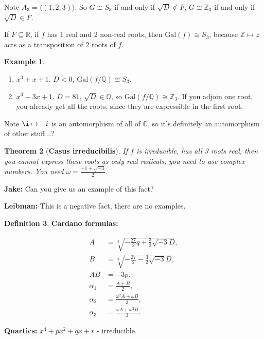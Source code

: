 \documentclass[9pt,reqno,twoside]{amsbook}
\theoremstyle{plain}
\newtheorem{theorem}{Theorem}[chapter]
\numberwithin{section}{chapter}
\numberwithin{equation}{chapter}
\theoremstyle{definition}
\newtheorem{Def}[theorem]{Definition}
\newtheorem{Ex}[theorem]{Example}
\theoremstyle{remark}
\theoremstyle{plain}
\newcommand{\sub}{\subseteq}
\newcommand{\R}{\mathbb{R}}
\newcommand{\z}{\mathbb{Z}}
\newcommand{\Q}{\mathbb{Q}}
\renewcommand{\c}{\mathbb{C}}
\newcommand{\bb}{\vspace{3mm}}
\newcommand{\bee}{\begin{equation}\begin{aligned}}
\newcommand{\eee}{\end{aligned}\end{equation}}
\newcommand{\fracc}{\frac}
\newcommand{\gal}{\mathrm{Gal}}
\newcommand{\qwe}{\sqrt}
\newcommand{\wer}{\sqrt}
\renewcommand{\bar}{\overline}%
\begin{document}
Note $A_3 = \langle (1,2,3) \rangle$. So $G \cong S_3$ if and only if $\qwe{D} \notin F$, $G \cong \z_3$ if and only if $\qwe{D} \in F$. 

\bb

If $F \sub \R$, if $f$ has 1 real and 2 non-real roots, then $\gal(f) \cong S_3$, because $\z \mapsto \bar{z}$ acts as a transposition of $2$ roots of $f$. 

\begin{Ex}
\begin{enumerate}
\item $x^3 + x + 1$. $D < 0$, $\gal(f/\Q) \cong S_3$. 

\item $x^3 - 3x + 1$. $D = 81$, $\qwe{D} \in \Q$, so $\gal(f/\Q) \cong \z_3$. If you adjoin one root, you already get all the roots, since they are expressible in the first root. 
\end{enumerate}
\end{Ex}

Note $\i \mapsto -i$ is an automorphism of all of $\c$, so it's definitely an automorphism of other stuff...?

\begin{theorem}[\textbf{Casus irreducibilis}]
If $f$ is irreducible, has all 3 roots real, then you cannot express these roots as only real radicals, you need to use complex numbers. You need $\omega = \fracc{-1 + \qwe{-3}}{2}$. 
\end{theorem}

\textbf{Jake: }Can you give us an example of this fact?

\textbf{Leibman: }This is a negative fact, there are no examples. 

\begin{Def}
\textbf{Cardano formulas: }

\bee
A &= \wer[3]{-\fracc{27}{2}q + \fracc{3}{2}\qwe{-3}D},\\
B &= \wer[3]{-\fracc{27}{2} - \fracc{3}{2}\qwe{-3}D},\\
AB &= -3p.\\
\alpha_1 &= \fracc{A + B}{2},\\
\alpha_2 &= \fracc{\omega^2A + \omega B}{3},\\
\alpha_3 &= \fracc{\omega A + \omega^2B}{3}.
\eee
\end{Def}

\textbf{Quartics: } $x^4 + px^2 + qx + r$ - irreducible. 
\end{document}
